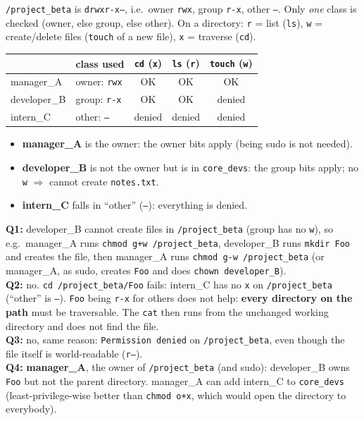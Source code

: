 \begin{algbox}[title={Solution --- ACL in Linux}]
\texttt{/project\_beta} is \texttt{drwxr-x---}, i.e.\ owner \texttt{rwx}, group
\texttt{r-x}, other \texttt{---}. Only \emph{one} class is
checked (owner, else group, else other). On a directory: \texttt{r} = list (\texttt{ls}),
\texttt{w} = create/delete files (\texttt{touch} of a new file), \texttt{x} = traverse
(\texttt{cd}).
\begin{center}
\begin{tabular}{l|l|c|c|c}
 & class used & \texttt{cd} (\texttt{x}) & \texttt{ls} (\texttt{r}) & \texttt{touch} (\texttt{w}) \\ \hline
manager\_A   & owner: \texttt{rwx}   & OK     & OK     & OK     \\
developer\_B & group: \texttt{r-x}   & OK     & OK     & denied \\
intern\_C    & other: \texttt{---}   & denied & denied & denied
\end{tabular}
\end{center}
\begin{itemize}
  \item \textbf{manager\_A} is the owner: the owner bits apply (being sudo is not
        needed).
  \item \textbf{developer\_B} is not the owner but is in \texttt{core\_devs}: the group
        bits apply; no \texttt{w} $\Rightarrow$ cannot create \texttt{notes.txt}.
  \item \textbf{intern\_C} falls in ``other'' (\texttt{---}): everything is denied.
\end{itemize}
\textbf{Q1:} developer\_B cannot create files in \texttt{/project\_beta} (group has no
\texttt{w}), so e.g.\ manager\_A runs \texttt{chmod g+w /project\_beta}, developer\_B runs
\texttt{mkdir Foo} and creates the file, then manager\_A runs \texttt{chmod g-w
/project\_beta} (or manager\_A, as sudo, creates \texttt{Foo} and does \texttt{chown
developer\_B}). \\
\textbf{Q2:} no. \texttt{cd /project\_beta/Foo} fails: intern\_C has no \texttt{x} on
\texttt{/project\_beta} (``other'' is \texttt{---}). \texttt{Foo} being \texttt{r-x} for
others does not help: \textbf{every directory on the path} must be traversable. The
\texttt{cat} then runs from the unchanged working directory and does not find the file. \\
\textbf{Q3:} no, same reason: \texttt{Permission denied} on \texttt{/project\_beta}, even
though the file itself is world-readable (\texttt{r--}). \\
\textbf{Q4:} \textbf{manager\_A}, the owner of \texttt{/project\_beta} (and sudo):
developer\_B owns \texttt{Foo} but not the parent directory. manager\_A can add intern\_C
to \texttt{core\_devs} (least-privilege-wise better than \texttt{chmod o+x}, which would
open the directory to everybody).
\end{algbox}

